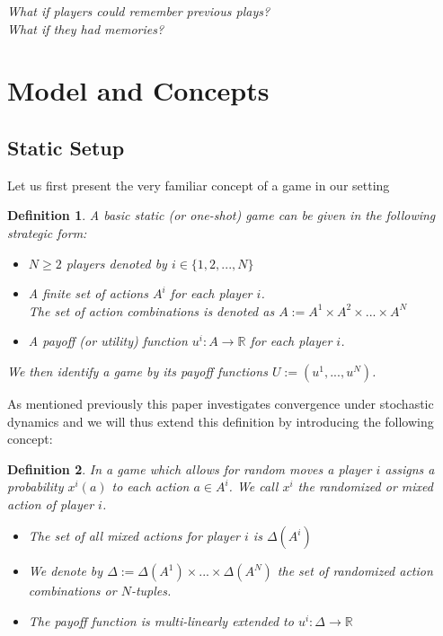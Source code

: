 \documentclass[a4paper]{article}
\theoremstyle{plain}
\newtheorem{definition}{Definition}
\theoremstyle{remark}
\begin{document}
\begin{center}
	\it
	What if players could remember previous plays?\\
	What if they had memories?
\end{center}

\section{Model and Concepts}


\subsection{Static Setup}

Let us first present the very familiar concept of a game in our setting

\begin{definition}
    A basic static (or one-shot) game can be given in the following
    strategic form:
    \begin{itemize}
        \item $N \geq 2$ players denoted by $i \in \{1, 2, ..., N\}$
        \item A finite set of actions $A^i$ for each player $i$.\\
            The set of action combinations is denoted as $A := A^1 \times A^2
            \times ... \times A^N$
        \item A payoff (or utility) function $u^i : A \to \mathbb{R}$ for each
            player $i$. 
    \end{itemize}
    We then identify a game by its payoff functions $U := (u^1, ..., u^N)$.
\end{definition}


As mentioned previously this paper investigates convergence under stochastic
dynamics and we will thus extend this definition by introducing the following
concept:

\begin{definition}
    In a game which allows for random moves a player $i$ assigns a
    probability $x^i(a)$ to each action $a \in A^i$. We call $x^i$ the
    \emph{randomized} or \emph{mixed} action of player $i$.
    \begin{itemize}
        \item The set of all mixed actions for player $i$ is $\Delta(A^i)$
        \item We denote by $\Delta := \Delta(A^1) \times ... \times \Delta(A^N)$
            the set of randomized action combinations or $N$-tuples.
        \item The payoff function is multi-linearly extended to $u^i : \Delta \to \mathbb{R}$
    \end{itemize}
\end{definition}
\end{document}
